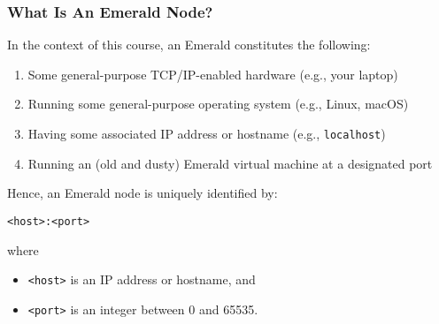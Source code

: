 \begin{frame}

\frametitle{What Is An Emerald Node?}

In the context of this course, an Emerald constitutes the following:

\begin{enumerate}

\footnotesize

\item Some general-purpose TCP/IP-enabled hardware (e.g., your laptop)

\item Running some general-purpose operating system (e.g., Linux, macOS)

\item Having some associated IP address or hostname (e.g.,
\texttt{localhost})

\item Running an (old and dusty) Emerald virtual machine at a
designated port

\end{enumerate}

\vspace{\fill}

Hence, an Emerald node is uniquely identified by:

\begin{center}

\texttt{<host>:<port>}

\end{center}

where

\begin{itemize}

\footnotesize

\item \texttt{<host>} is an IP address or hostname, and

\item \texttt{<port>} is an integer between 0 and 65535.

\end{itemize}

\end{frame}
